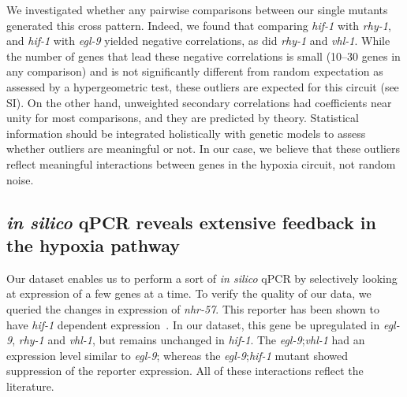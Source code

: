 \documentclass[9pt,twocolumn,twoside]{pnas-new}
\newcommand{\egl}{\emph{egl-9}}
\newcommand{\rhy}{\emph{rhy-1}}
\newcommand{\vhl}{\emph{vhl-1}}
\newcommand{\hif}{\emph{hif-1}}
\newcommand{\nhr}{\emph{nhr-57}}
\begin{document}
We investigated whether any pairwise comparisons between our single mutants
generated this cross pattern. Indeed, we found that comparing \hif{} with \rhy{},
and \hif{} with \egl{} yielded negative correlations, as did \rhy{} and \vhl{}.
While the number of genes that lead these negative correlations is small (10--30
genes in any comparison) and is not significantly different from random
expectation as assessed by a hypergeometric test, these outliers are expected
for this circuit (see SI). On the other hand, unweighted secondary correlations
had coefficients near unity for most comparisons, and they are predicted by
theory. Statistical information should be integrated holistically with genetic
models to assess whether outliers are meaningful or not. In our case, we believe
that these outliers reflect meaningful interactions between genes in the hypoxia
circuit, not random noise.


\subsection{\emph{in silico} qPCR reveals extensive feedback in the hypoxia pathway}
\label{sub:qPCR}
Our dataset enables us to perform a sort of \emph{in silico} qPCR by selectively
looking at expression of a few genes at a time. To verify the quality of our
data, we queried the changes in expression of \nhr{}. This reporter has been
shown to have \hif{} dependent expression~\cite{Shen2006,Shen2005,Ackerman2012,
Park2012}. In our dataset, this gene be upregulated in \egl{}, \rhy{} and
\vhl{}, but remains unchanged in \hif{}.
The \egl{};\vhl{} had an expression level similar to \egl{}; whereas the
\egl{};\hif{} mutant showed suppression of the reporter expression. All of these
interactions reflect the literature.
\end{document}
